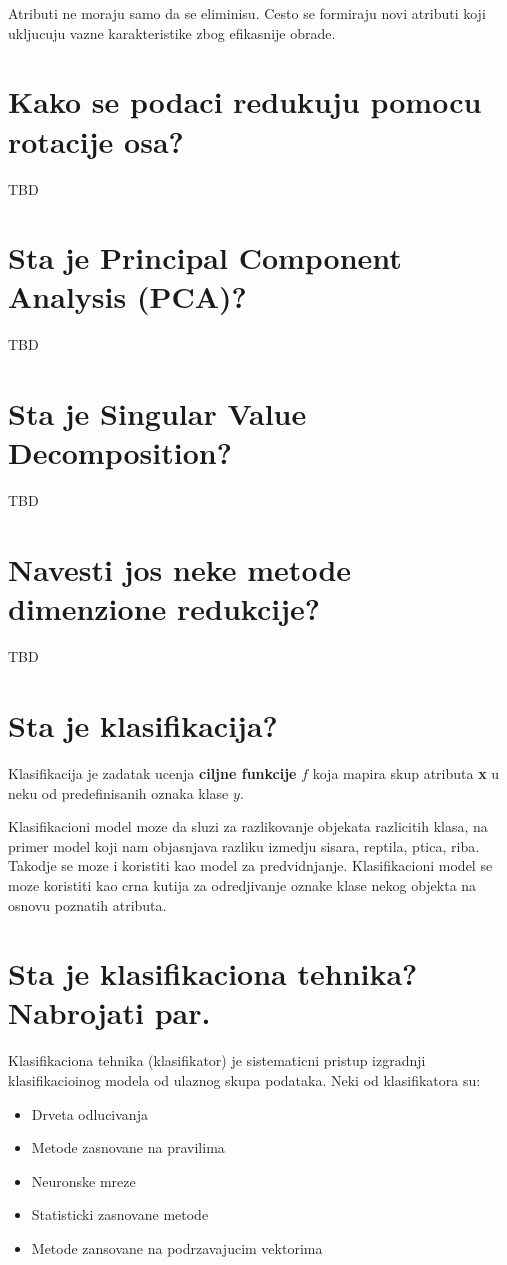 \documentclass[a4paper]{article}
\begin{document}
Atributi ne moraju samo da se eliminisu. Cesto se formiraju novi atributi koji ukljucuju vazne
karakteristike zbog efikasnije obrade.

\section{Kako se podaci redukuju pomocu rotacije osa?}
TBD

\section{Sta je Principal Component Analysis (PCA)?}
TBD

\section{Sta je Singular Value Decomposition?}
TBD

\section{Navesti jos neke metode dimenzione redukcije?}
TBD

\section{Sta je klasifikacija?}
Klasifikacija je zadatak ucenja \textbf{ciljne funkcije} \(f\) koja mapira skup atributa \textbf{x}
u neku od predefinisanih oznaka klase \(y\).

Klasifikacioni model moze da sluzi za razlikovanje objekata razlicitih klasa, na primer model koji
nam objasnjava razliku izmedju sisara, reptila, ptica, riba. Takodje se moze i koristiti kao model
za predvidnjanje. Klasifikacioni model se moze koristiti kao crna kutija za odredjivanje oznake
klase nekog objekta na osnovu poznatih atributa.

\section{Sta je klasifikaciona tehnika? Nabrojati par.}
Klasifikaciona tehnika (klasifikator) je sistematicni pristup izgradnji klasifikacioinog modela od
ulaznog skupa podataka. Neki od klasifikatora su:
\begin{itemize}
    \item Drveta odlucivanja
    \item Metode zasnovane na pravilima
    \item Neuronske mreze
    \item Statisticki zasnovane metode
    \item Metode zansovane na podrzavajucim vektorima
\end{itemize}
\end{document}

